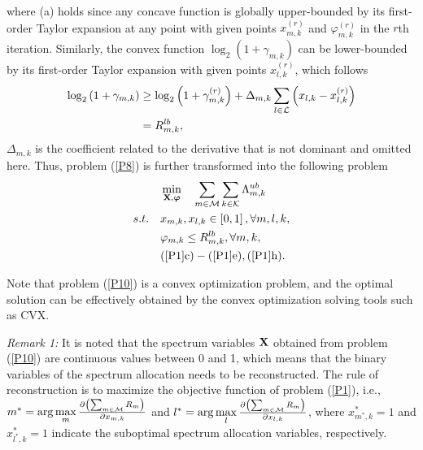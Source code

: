 \documentclass[journal]{IEEEtran}
\begin{document}
where (a) holds since any concave function is globally upper-bounded by its first-order Taylor expansion at any point \cite{book-Convex} with given points $x_{m,k}^{\left( r \right)} $ and $ \varphi _{m,k}^{\left( r \right)} $ in the $r$th iteration. Similarly, the convex function $ {\log _2}\left( {1 + {\gamma _{m,k}}} \right) $ can be lower-bounded by its first-order Taylor expansion with given points $ x_{l,k}^{\left( r \right)} $, which follows 
\begin{align}
	{\log _2}\left( {1 + {\gamma _{m,k}}} \right) &\ge {\log _2}\left( {1 + \gamma _{m,k}^{\left( r \right)}} \right) + {\Delta _{m,k}}\sum\limits_{l \in {\cal L}} {\left( {{x_{l,k}} - x_{l,k}^{\left( r \right)}} \right)}  \nonumber\\
	&= R_{m,k}^{lb} ,
\end{align}
$\scriptstyle {\Delta _{m,k}} $ is the coefficient related to the derivative that is not dominant and omitted here. Thus, problem (\ref{P8}) is further transformed into the following problem
\begin{subequations}\label{P10}
	\begin{align}
	&\mathop {\min }\limits_{{\bf{X}},\bm{\varphi} } \quad \sum\limits_{m \in {\cal M}} {\sum\limits_{k \in {\cal K}} {\Lambda _{m,k}^{ub}} } \\
	s.t.\quad &{x_{m,k}},{x_{l,k}} \in \left[ {0,1} \right],\forall m,l,k,\\
    &{\varphi _{m,k}} \le R_{m,k}^{lb},\forall m,k,\\
	&(\ref{P1}\rm{c})-(\ref{P1}\rm{e}),(\ref{P1}h).
	\end{align}
\end{subequations}

\noindent Note that problem (\ref{P10}) is a convex optimization problem, and the optimal solution can be effectively obtained by the convex
optimization solving tools such as CVX.


\textit{Remark 1:} It is noted that the spectrum variables $ \bf{X} $ obtained from problem (\ref{P10}) are continuous values between 0 and 1, which means that the binary variables of the spectrum allocation needs to be reconstructed. The rule of reconstruction is to maximize the objective function of problem (\ref{P1}), i.e., $ {m^*} = \arg \mathop {\max }\limits_m \frac{{\partial \left( {\sum\nolimits_{m \in {\cal M}} {{R_m}} } \right)}}{{\partial {x_{m,k}}}} $ and $ {l^*} = \arg \mathop {\max }\limits_l \frac{{\partial \left( {\sum\nolimits_{m \in {\cal M}} {{R_m}} } \right)}}{{\partial {x_{l,k}}}} $, where $ x_{{m^*},k}^* = 1 $ and $ x_{{l^*},k}^* = 1$ indicate the suboptimal spectrum allocation variables, respectively.
\end{document}

